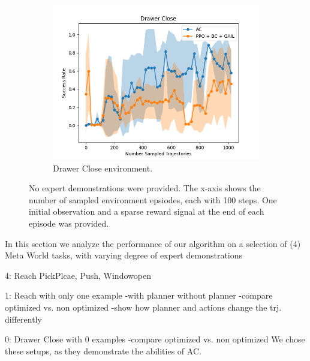 \begin{figure}[htbp]
    \centering
    \begin{subfigure}[b]{0.45\textwidth}
      \includegraphics[width=\textwidth]{images/0/Drawer Close.png}
      \caption{Drawer Close environment.}
      \label{fig:plot1}
    \end{subfigure}
    \caption{No expert demonstrations were provided. 
    The x-axis shows the number of sampled environment epsiodes, each with 100 steps. One initial observation and a sparse reward signal at the end of each episode was provided.}
    \label{fig:fourplots}
\end{figure}

In this section we analyze the performance of our algorithm on a selection of (4) Meta World tasks, with varying degree of expert demonstrations

4: Reach PickPlcae, Push, Windowopen 

1: Reach with only one example
-with planner without planner
-compare optimized vs. non optimized
-show how planner and actions change the trj. differently

0: Drawer Close with 0 examples
-compare optimized vs. non optimized
We chose these setups, as they demonstrate the abilities of AC.

